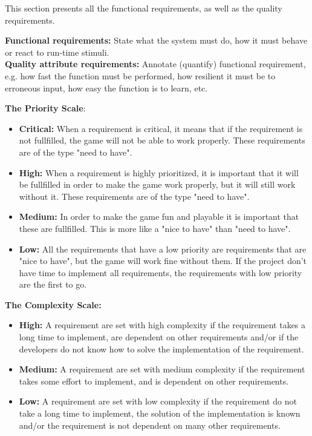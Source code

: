 This section presents all the functional requirements, as well as the quality requirements.

{\bf Functional requirements:} State what the system must do, how it must behave or react 
to run-time stimuli. \\
{\bf Quality attribute requirements:} Annotate (quantify) functional requirement, e.g. how fast 
the function must be performed, how resilient it must be to erroneous input, how easy the 
function is to learn, etc.

{\bf The Priority Scale}:
\begin{itemize}
	\item {\bf Critical:} When a requirement is critical, it means that if the requirement is
	not fullfilled, the game will not be able to work properly. These requirements are of the
	type "need to have".
	\item {\bf High:} When a requirement is highly prioritized, it is important that it will
	be fullfilled in order to make the game work properly, but it will still work without it.
	These requirements are of the type "need to have".
	\item {\bf Medium: } In order to make the game fun and playable it is important that these are 
	fullfilled. This is more like a "nice to have" than "need to have".
	\item {\bf Low:} All the requirements that have a low priority are requirements that are "nice to have",
	but the game will work fine without them. If the project don't have time to implement all
	requirements, the requirements with low priority are the first to go.
\end{itemize}

{\bf The Complexity Scale:}
\begin{itemize}
	\item {\bf High:} A requirement are set with high complexity if the requirement takes a long 
	time to implement, are dependent on other requirements and/or if the developers do not know
	how to solve the implementation of the requirement.
	\item {\bf Medium:} A requirement are set with medium complexity if the requirement takes 
	some effort to implement, and is dependent on other requirements.
	\item {\bf Low:} A requirement are set with low complexity if the requirement do not take
	a long time to implement, the solution of the implementation is known and/or the requirement
	is not dependent on many other requirements.
\end{itemize}